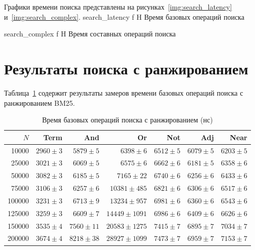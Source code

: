 \documentclass{itmo}
\begin{document}
Графики времени поиска представлены на рисунках~\ref{img:search_latency} и~\ref{img:search_complex}.
	{search_latency}
	{f}
	{H}
	{\textwidth}
	{Время базовых операций поиска}

	{search_complex}
	{f}
	{H}
	{\textwidth}
	{Время составных операций поиска}

\section{Результаты поиска с ранжированием}

Таблица~\ref{tab:searchrank-basic} содержит результаты замеров времени базовых операций поиска с ранжированием BM25.
\begin{table}[H]
	\centering
	\caption{Время базовых операций поиска с ранжированием (нс)}
	\label{tab:searchrank-basic}
	\begin{tabular}{|r|r|r|r|r|r|r|}
		\toprule
		$N$ & Term & And & Or & Not & Adj & Near \\
		\midrule
		10000  & $2960 \pm 3$    & $5879 \pm 5$    & $6398 \pm 6$     & $6512 \pm 5$   & $6079 \pm 5$   & $6203 \pm 5$  \\
		25000  & $3021 \pm 3$    & $6069 \pm 5$    & $6575 \pm 6$     & $6662 \pm 6$   & $6181 \pm 5$   & $6358 \pm 6$  \\
		50000  & $3082 \pm 3$    & $6185 \pm 5$    & $7165 \pm 22$    & $6740 \pm 6$   & $6256 \pm 6$   & $6433 \pm 6$  \\
		75000  & $3106 \pm 3$    & $6257 \pm 6$    & $10381 \pm 485$  & $6821 \pm 6$   & $6306 \pm 6$   & $6517 \pm 6$  \\
		100000 & $3231 \pm 3$    & $6713 \pm 9$    & $13234 \pm 957$  & $6981 \pm 6$   & $6360 \pm 6$   & $6543 \pm 6$  \\
		125000 & $3259 \pm 3$    & $6609 \pm 7$    & $14449 \pm 1091$ & $6986 \pm 6$   & $6409 \pm 6$   & $6626 \pm 6$  \\
		150000 & $3535 \pm 4$    & $7560 \pm 11$   & $20583 \pm 1275$ & $7415 \pm 7$   & $6895 \pm 7$   & $7034 \pm 7$  \\
		200000 & $3674 \pm 4$    & $8218 \pm 38$   & $28927 \pm 1099$ & $7473 \pm 7$   & $6959 \pm 7$   & $7153 \pm 7$  \\
		\bottomrule
	\end{tabular}
\end{table}
\end{document}
